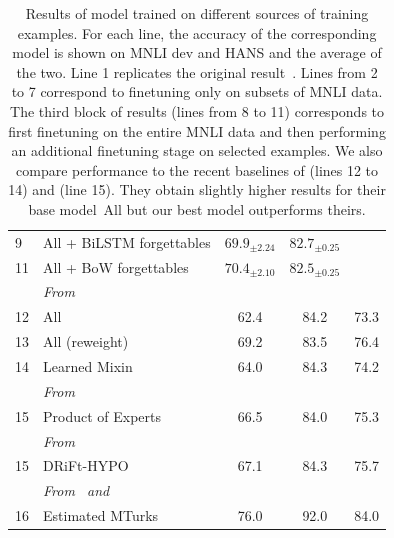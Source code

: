 \begin{table}[ht]
\begin{tabular}{llccc}
\small{9} & All + BiLSTM forgettables 
&  $69.9_{\pm 2.24}$  & $82.7_{\pm 0.25}$             &  \\
\small{11} & All + BoW forgettables    & $70.4_{\pm 2.10}$                     & $82.5_{\pm 0.25}$             &  \\
\midrule
&\emph{From~\citet{clark2019dont}} & & & \\
\small{12} & All & 62.4 & 84.2 & 73.3 \\
\small{13} & All (reweight) & 69.2 & 83.5 & 76.4 \\
\small{14} & Learned Mixin & 64.0 & 84.3 & 74.2\\
\midrule
&\emph{From~\citet{mahabadi2019simple}} & & &  \\
\small{15} & Product of Experts & 66.5 & 84.0 & 75.3     \\
\midrule
&\emph{From~\citet{he2019unlearn}} & & &  \\
\small{15} & DRiFt-HYPO & 67.1 & 84.3 & 75.7     \\
\midrule
&\emph{From~\citet{linzen2019right} and \citet{Nangia_2019}} & & &  \\
\small{16} & Estimated MTurks & 76.0 & 92.0 & 84.0 \\
\bottomrule
\end{tabular}
\caption{Results of \bertbase model trained on different sources of training examples. For each line, the accuracy of the corresponding model is shown on MNLI dev and HANS and the average of the two.  
Line 1 replicates the original \bertbase result~\citep{devlin2018bert}.
Lines from 2 to 7 correspond to finetuning only on subsets of MNLI data. The third block of results (lines from 8 to 11) corresponds to first finetuning \bertbase on the entire MNLI data and then performing an additional finetuning stage on selected examples. We also compare performance to the recent baselines of  (lines 12 to 14) and  (line 15). They obtain slightly higher results for their base model~\textrm{All} but our best model outperforms theirs.}
\label{tab:twoclass}
\end{table}

